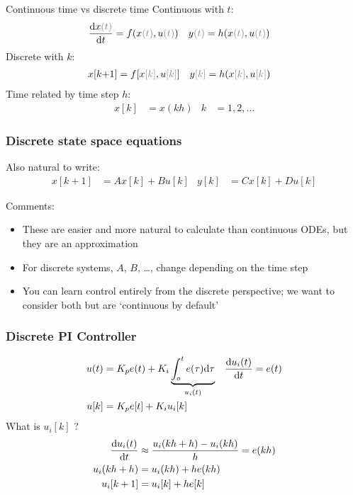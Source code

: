 \documentclass{beamer-control}
\begin{document}

\begin{frame}{Continuous time vs discrete time}
Continuous with $t$:
\def\tt{{\color{gray}(t)}}
\def\kk{{\color{gray}[k]}}
\begin{align}
\Deriv{x\tt}{t} &= f(x\tt,u\tt) & y\tt &= h(x\tt,u\tt)
\end{align}
Discrete with $k$:
\begin{align}
x[k{+}1] &= f[x\kk,u\kk] & y\kk &= h(x\kk,u\kk)
\end{align}
Time related by time step $h$:
\begin{align}
x[k] &= x(kh) & k &= 1,2,\dots
\end{align}
\end{frame}

\begin{frame}
\frametitle{Discrete state space equations}
Also natural to write:
\begin{align}
x[k+1] &= Ax[k] + Bu[k] & y[k] &= Cx[k] + Du[k]
\end{align}

Comments:
\begin{itemize}
\item
These are easier and more natural to calculate than continuous ODEs, but they are an approximation
\item
For discrete systems, $A$, $B$, \dots, change depending on the time step 
\item
You can learn control entirely from the discrete perspective; we want to consider both but are `continuous by default'
\end{itemize}
\end{frame}

\begin{frame}
\frametitle{Discrete PI Controller}
\begin{align}
u(t) &= K_p e(t) + K_i \underbrace{\int_o^t e(\tau) \mathrm{d} \tau}_{u_i(t)} & \frac{\mathrm{d} u_i(t)}{\mathrm{d} t} &= e(t) \\
u[k] &= K_p e[t] + K_i u_i[k]
\end{align}
What is $u_i[k]$ ?
\begin{align}
\frac{\mathrm{d} u_i(t)}{\mathrm{d} t} &\approx \frac{u_i(kh+h)-u_i(kh)}{h} = e(kh) \\
u_i(kh+h) &= u_i(kh) + he(kh) \\
u_i[k+1] &= u_i[k] + he[k]
\end{align}
\end{frame}


\end{document}
